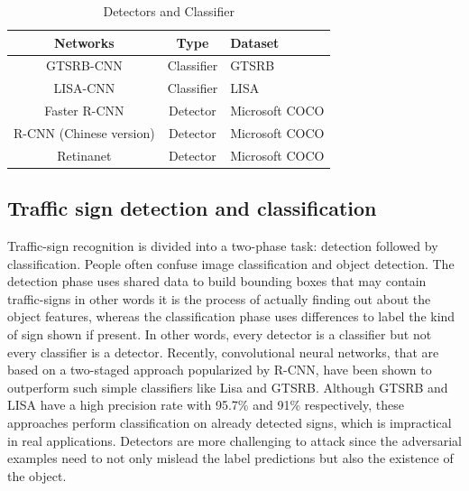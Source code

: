 \documentclass[sigconf, nonacm]{acmart}
\begin{document}
\begin{table}[hb]%
  \caption{Detectors and Classifier}
  \label{tab:freq}
  \begin{tabular}{ccl}
    \toprule
    Networks & Type & Dataset\\
    \midrule
    GTSRB-CNN &  Classifier & GTSRB\\
    LISA-CNN & Classifier & LISA\\
    Faster R-CNN & Detector & Microsoft COCO\\
    R-CNN (Chinese version) & Detector & Microsoft COCO\\
    Retinanet & Detector & Microsoft COCO\\
  \bottomrule
\end{tabular}
\end{table}



\subsection{ Traffic sign detection and classification 
}
Traffic-sign recognition is divided into a two-phase task: detection followed by classification. People often confuse image classification and object detection. The detection phase uses shared data to build bounding boxes that may contain traffic-signs in other words it is the process of actually finding out about the object features, whereas the classification phase uses differences to label the kind of sign shown if present. In other words, every detector is a classifier but not every classifier is a detector. 
Recently, convolutional neural networks, that are based on a two-staged approach popularized by R-CNN, have been shown to outperform such simple classifiers like Lisa and GTSRB. Although GTSRB and LISA have a high precision rate with 95.7\% and 91\% respectively, these approaches perform classification on already detected signs, which is impractical in real applications. Detectors are more challenging to attack since the adversarial examples need  to not only mislead the label predictions but also the existence of the object. 
\end{document}
